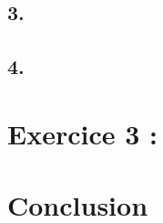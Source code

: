 \documentclass[a4paper, 10pt]{article}
\begin{document}
\subsection*{3.}

\subsection*{4. }

\section*{Exercice 3 : }

\subsection*{}
\subsection*{}
\subsection*{}

\section*{Conclusion}
\end{document}
